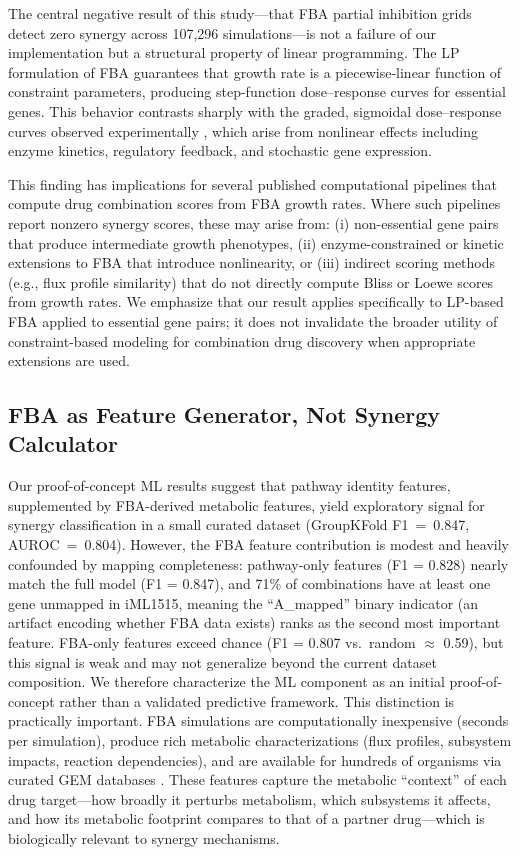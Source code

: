 \documentclass[12pt,a4paper]{article}
\begin{document}
The central negative result of this study---that FBA partial inhibition grids detect zero synergy across 107,296 simulations---is not a failure of our implementation but a structural property of linear programming. The LP formulation of FBA guarantees that growth rate is a piecewise-linear function of constraint parameters, producing step-function dose--response curves for essential genes. This behavior contrasts sharply with the graded, sigmoidal dose--response curves observed experimentally \citep{bollenbach2009, cokol2011}, which arise from nonlinear effects including enzyme kinetics, regulatory feedback, and stochastic gene expression.

This finding has implications for several published computational pipelines that compute drug combination scores from FBA growth rates. Where such pipelines report nonzero synergy scores, these may arise from: (i) non-essential gene pairs that produce intermediate growth phenotypes, (ii) enzyme-constrained or kinetic extensions to FBA that introduce nonlinearity, or (iii) indirect scoring methods (e.g., flux profile similarity) that do not directly compute Bliss or Loewe scores from growth rates. We emphasize that our result applies specifically to LP-based FBA applied to essential gene pairs; it does not invalidate the broader utility of constraint-based modeling for combination drug discovery when appropriate extensions are used.

\subsection{FBA as Feature Generator, Not Synergy Calculator}

Our proof-of-concept ML results suggest that pathway identity features, supplemented by FBA-derived metabolic features, yield exploratory signal for synergy classification in a small curated dataset (GroupKFold F1~=~0.847, AUROC~=~0.804). However, the FBA feature contribution is modest and heavily confounded by mapping completeness: pathway-only features (F1 = 0.828) nearly match the full model (F1 = 0.847), and 71\% of combinations have at least one gene unmapped in iML1515, meaning the ``A\_mapped'' binary indicator (an artifact encoding whether FBA data exists) ranks as the second most important feature. FBA-only features exceed chance (F1 = 0.807 vs.\ random $\approx$ 0.59), but this signal is weak and may not generalize beyond the current dataset composition. We therefore characterize the ML component as an initial proof-of-concept rather than a validated predictive framework. This distinction is practically important. FBA simulations are computationally inexpensive (seconds per simulation), produce rich metabolic characterizations (flux profiles, subsystem impacts, reaction dependencies), and are available for hundreds of organisms via curated GEM databases \citep{king2016}. These features capture the metabolic ``context'' of each drug target---how broadly it perturbs metabolism, which subsystems it affects, and how its metabolic footprint compares to that of a partner drug---which is biologically relevant to synergy mechanisms.
\end{document}
